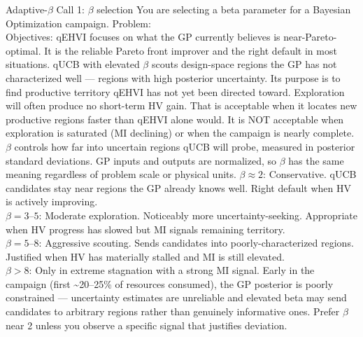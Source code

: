 \begin{fragmentbox}{Adaptive-$\beta$ Call 1: $\beta$ selection}
\promptfont
You are selecting a beta parameter for a Bayesian Optimization campaign.
\vspace{0.35em}
Problem: \\
Objectives: 
\vspace{0.35em}
qEHVI focuses on what the GP currently believes is near-Pareto-optimal. It is the
reliable Pareto front improver and the right default in most situations.
\vspace{0.35em}
qUCB with elevated $\beta$ scouts design-space regions the GP has not characterized
well --- regions with high posterior uncertainty. Its purpose is to find productive
territory qEHVI has not yet been directed toward. Exploration will often produce no
short-term HV gain. That is acceptable when it locates new productive regions faster
than qEHVI alone would. It is NOT acceptable when exploration is saturated (MI
declining) or when the campaign is nearly complete.
\vspace{0.35em}
$\beta$ controls how far into uncertain regions qUCB will probe, measured in
posterior standard deviations. GP inputs and outputs are normalized, so $\beta$ has
the same meaning regardless of problem scale or physical units.
\vspace{0.35em}
\hspace*{1em}$\beta \approx 2$: Conservative. qUCB candidates stay near regions the GP already knows well. Right default when HV is actively improving.\\
\hspace*{1em}$\beta = 3$--$5$: Moderate exploration. Noticeably more uncertainty-seeking. Appropriate when HV progress has slowed but MI signals remaining territory.\\
\hspace*{1em}$\beta = 5$--$8$: Aggressive scouting. Sends candidates into poorly-characterized regions. Justified when HV has materially stalled and MI is still elevated.\\
\hspace*{1em}$\beta > 8$: Only in extreme stagnation with a strong MI signal.
\vspace{0.35em}
Early in the campaign (first \~{}20--25\% of resources consumed), the GP posterior is
poorly constrained --- uncertainty estimates are unreliable and elevated beta may send
candidates to arbitrary regions rather than genuinely informative ones. Prefer
$\beta$ near 2 unless you observe a specific signal that justifies deviation.

\end{fragmentbox}
